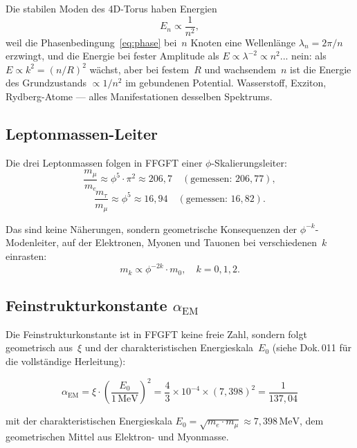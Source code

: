 Die stabilen Moden des 4D-Torus haben Energien
\begin{equation}
  E_n \propto \frac{1}{n^2},
\end{equation}
weil die Phasenbedingung~\eqref{eq:phase} bei~$n$ Knoten eine Wellenlänge
$\lambda_n = 2\pi/n$ erzwingt, und die Energie bei fester Amplitude
als $E \propto \lambda^{-2} \propto n^2$... nein: als $E \propto k^2 = (n/R)^2$
wächst, aber bei festem~$R$ und wachsendem~$n$ ist die Energie des
Grundzustands $\propto 1/n^2$ im gebundenen Potential. Wasserstoff,
Exziton, Rydberg-Atome — alles Manifestationen desselben Spektrums.

\subsection{Leptonmassen-Leiter}

Die drei Leptonmassen folgen in FFGFT einer $\phi$-Skalierungsleiter:
\begin{equation}
  \frac{m_\mu}{m_e} \approx \phi^5 \cdot \pi^2 \approx 206{,}7
  \quad (\text{gemessen: } 206{,}77),
\end{equation}
\begin{equation}
  \frac{m_\tau}{m_\mu} \approx \phi^5
  \approx 16{,}94
  \quad (\text{gemessen: } 16{,}82).
\end{equation}

Das sind keine Näherungen, sondern geometrische Konsequenzen der
$\phi^{-k}$-Modenleiter, auf der Elektronen, Myonen und Tauonen bei
verschiedenen~$k$ einrasten:
\begin{equation}
  m_k \propto \phi^{-2k} \cdot m_0, \quad k = 0, 1, 2.
\end{equation}

\subsection{Feinstrukturkonstante $\alpha_\text{EM}$}

Die Feinstrukturkonstante ist in FFGFT keine freie Zahl, sondern
folgt geometrisch aus~$\xi$ und der charakteristischen Energieskala~$E_0$
(siehe Dok.\,011 für die vollständige Herleitung):

\begin{equation}
  \alpha_\text{EM} = \xi \cdot \left(\frac{E_0}{1\,\text{MeV}}\right)^2
  = \frac{4}{3} \times 10^{-4} \times (7{,}398)^2
  = \frac{1}{137{,}04}
\end{equation}

\noindent mit der charakteristischen Energieskala
$E_0 = \sqrt{m_e \cdot m_\mu} \approx 7{,}398\,\text{MeV}$,
dem geometrischen Mittel aus Elektron- und Myonmasse.

